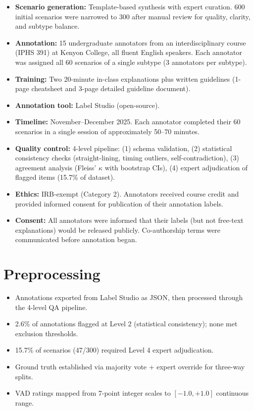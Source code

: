 \documentclass[11pt]{article}
\begin{document}
\begin{itemize}[leftmargin=*]
    \item \textbf{Scenario generation:} Template-based synthesis with expert curation. 600 initial scenarios were narrowed to 300 after manual review for quality, clarity, and subtype balance.
    \item \textbf{Annotation:} 15 undergraduate annotators from an interdisciplinary course (IPHS 391) at Kenyon College, all fluent English speakers. Each annotator was assigned all 60 scenarios of a single subtype (3 annotators per subtype).
    \item \textbf{Training:} Two 20-minute in-class explanations plus written guidelines (1-page cheatsheet and 3-page detailed guideline document).
    \item \textbf{Annotation tool:} Label Studio (open-source).
    \item \textbf{Timeline:} November--December 2025. Each annotator completed their 60 scenarios in a single session of approximately 50--70 minutes.
    \item \textbf{Quality control:} 4-level pipeline: (1) schema validation, (2) statistical consistency checks (straight-lining, timing outliers, self-contradiction), (3) agreement analysis (Fleiss' $\kappa$ with bootstrap CIs), (4) expert adjudication of flagged items (15.7\% of dataset).
    \item \textbf{Ethics:} IRB-exempt (Category 2). Annotators received course credit and provided informed consent for publication of their annotation labels.
    \item \textbf{Consent:} All annotators were informed that their labels (but not free-text explanations) would be released publicly. Co-authorship terms were communicated before annotation began.
\end{itemize}

\section{Preprocessing}

\begin{itemize}[leftmargin=*]
    \item Annotations exported from Label Studio as JSON, then processed through the 4-level QA pipeline.
    \item 2.6\% of annotations flagged at Level 2 (statistical consistency); none met exclusion thresholds.
    \item 15.7\% of scenarios (47/300) required Level 4 expert adjudication.
    \item Ground truth established via majority vote + expert override for three-way splits.
    \item VAD ratings mapped from 7-point integer scales to $[-1.0, +1.0]$ continuous range.
\end{itemize}
\end{document}
